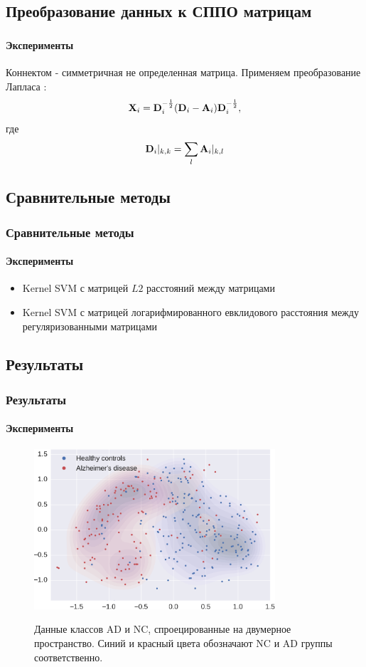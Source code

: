 \documentclass[xcolor=table]{beamer}
\newcommand{\bx}{{\bf X}}
\newcommand{\bd}{{\bf D}}
\newcommand{\ba}{{\bf A}}
\begin{document}
    \subsection[Преобразование данных к СППО матрицам]{Преобразование данных к СППО матрицам}
    \begin{frame}
        \frametitle{}
        \framesubtitle{Эксперименты}
        Коннектом - симметричная не определенная матрица. Применяем преобразование Лапласа \cite{dodero2015kernel}:
        $$\bx_i = \bd_i^{-\frac{1}{2}} (\bd_i - \ba_i) \bd_i^{-\frac{1}{2}},$$
        где $$\bd_i \rvert_{k,k} = \sum_{\substack{l}} \ba_i\rvert_{k,l}$$
    \end{frame}

    \subsection[Сравнительные методы]{Сравнительные методы}
    \begin{frame}
    \frametitle{Сравнительные методы}
    \framesubtitle{Эксперименты}
    \begin{itemize}
        \item Kernel SVM с матрицей $L2$ расстояний между матрицами
        \item Kernel SVM с матрицей логарифмированного евклидового расстояния между регуляризованными матрицами \cite{dodero2015kernel}
    \end{itemize}
    \end{frame}

    \subsection[Результаты]{Результаты}
    \begin{frame}
    \frametitle{Результаты}
    \framesubtitle{Эксперименты}
    \begin{figure}[h!]
    \centering
    \includegraphics[width=0.8\textwidth]{img/dr.pdf}\label{fig:dr}
    \caption{Данные классов AD и NC, спроецированные на двумерное пространство. Синий и красный цвета обозначают NC и AD группы соответственно.}
    \end{figure}
    \end{frame}
\end{document}
